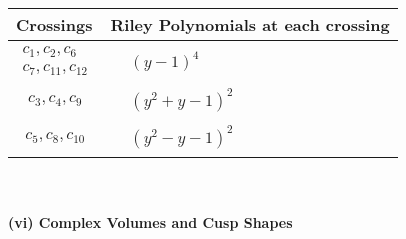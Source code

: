 \documentclass[1p]{elsarticle_modified}
\theoremstyle{definition}
\begin{document}
\begin{tabular}{m{50pt}|m{274pt}}
Crossings & \hspace{64pt}Riley Polynomials at each crossing \\
\hline $$\begin{aligned}c_{1},c_{2},c_{6}\\c_{7},c_{11},c_{12}\end{aligned}$$&$\begin{aligned}
&(y-1)^4
\end{aligned}$\\
\hline $$\begin{aligned}c_{3},c_{4},c_{9}\end{aligned}$$&$\begin{aligned}
&(y^2+y-1)^2
\end{aligned}$\\
\hline $$\begin{aligned}c_{5},c_{8},c_{10}\end{aligned}$$&$\begin{aligned}
&(y^2- y-1)^2
\end{aligned}$\\
\hline
\end{tabular}\\~\\
\newpage\flushleft \textbf{(vi) Complex Volumes and Cusp Shapes}
\end{document}
